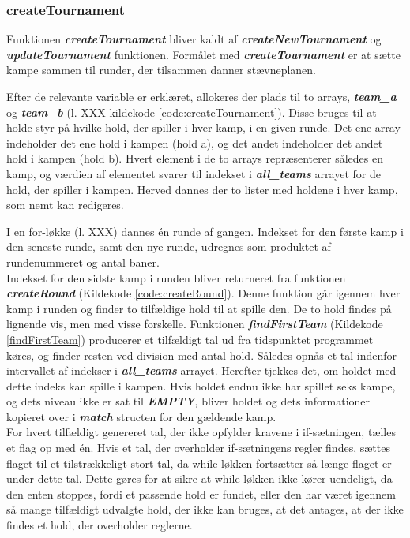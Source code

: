\subsubsection{createTournament}
Funktionen \textbf{\textit{createTournament}} bliver kaldt af \textbf{\textit{createNewTournament}} og \textbf{\textit{updateTournament}} funktionen. Formålet med \textbf{\textit{createTournament}} er at sætte kampe sammen til runder, der tilsammen danner stævneplanen.
\par
Efter de relevante variable er erklæret, allokeres der plads til to arrays, \textbf{\textit{team\_a}} og \textbf{\textit{team\_b}} (l. XXX kildekode \ref{code:createTournament}). Disse bruges til at holde styr på hvilke hold, der spiller i hver kamp, i en given runde. Det ene array indeholder det ene hold i kampen (hold a), og det andet indeholder det andet hold i kampen (hold b). Hvert element i de to arrays repræsenterer således en kamp, og værdien af elementet svarer til indekset i \textbf{\textit{all\_teams}} arrayet for de hold, der spiller i kampen. Herved dannes der to lister med holdene i hver kamp, som nemt kan redigeres.
\par
I en for-løkke (l. XXX) dannes én runde af gangen. Indekset for den første kamp i den seneste runde, samt den nye runde, udregnes som produktet af rundenummeret og antal baner. \\
Indekset for den sidste kamp i runden bliver returneret fra funktionen \textbf{\textit{createRound}} (Kildekode \ref{code:createRound}). Denne funktion går igennem hver kamp i runden og finder to tilfældige hold til at spille den. De to hold findes på lignende vis, men med visse forskelle. Funktionen \textbf{\textit{findFirstTeam}} (Kildekode \ref{findFirstTeam}) producerer et tilfældigt tal ud fra tidspunktet programmet køres, og finder resten ved division med antal hold. Således opnås et tal indenfor intervallet af indekser i \textbf{\textit{all\_teams}} arrayet. Herefter tjekkes det, om holdet med dette indeks kan spille i kampen. Hvis holdet endnu ikke har spillet seks kampe, og dets niveau ikke er sat til \textbf{\textit{EMPTY}}, bliver holdet og dets informationer kopieret over i \textbf{\textit{match}} structen for den gældende kamp. \\
For hvert tilfældigt genereret tal, der ikke opfylder kravene i if-sætningen, tælles et flag op med én. Hvis et tal, der overholder if-sætningens regler findes, sættes flaget til et tilstrækkeligt stort tal, da while-løkken fortsætter så længe flaget er under dette tal. Dette gøres for at sikre at while-løkken ikke kører uendeligt, da den enten stoppes, fordi et passende hold er fundet, eller den har været igennem så mange tilfældigt udvalgte hold, der ikke kan bruges, at det antages, at der ikke findes et hold, der overholder reglerne.
